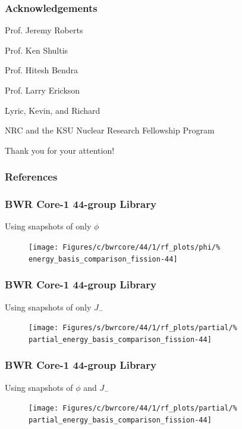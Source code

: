 \documentclass[fleqn]{beamer}
\begin{document}
  \begin{frame}
      \frametitle{Acknowledgements}
      \begin{block}{}
              Prof. Jeremy Roberts
              
              Prof. Ken Shultis
              
              Prof. Hitesh Bendra
              
              Prof. Larry Erickson
              
              Lyric, Kevin, and Richard
              
              NRC and the KSU Nuclear Research Fellowship Program
      \end{block}
      Thank you for your attention!
  \end{frame}

  
  \begin{frame}[t,allowframebreaks]\label{lastframe}
    \frametitle{References}
    
    {\scriptsize }
  \end{frame}
  
  \beginbackup
  
    \begin{frame}[noframenumbering]
    \frametitle{BWR Core-1 44-group Library}
    \centering
    Using snapshots of only $\phi$
    \begin{figure}
    \texttt{[image: Figures/c/bwrcore/44/1/rf\_plots/phi/\%
        energy\_basis\_comparison\_fission-44]}
    \end{figure}
  \end{frame}
  
  \begin{frame}[noframenumbering]
    \frametitle{BWR Core-1 44-group Library}
    \centering
    Using snapshots of only $J_-$
    \begin{figure}
    \texttt{[image: Figures/s/bwrcore/44/1/rf\_plots/partial/\%
        partial\_energy\_basis\_comparison\_fission-44]}
    \end{figure}
  \end{frame}
  
  \begin{frame}[noframenumbering]
    \frametitle{BWR Core-1 44-group Library}
    \centering
    Using snapshots of $\phi$ and $J_-$
    \begin{figure}
    \texttt{[image: Figures/c/bwrcore/44/1/rf\_plots/partial/\%
        partial\_energy\_basis\_comparison\_fission-44]}
    \end{figure}
  \end{frame}
  
\end{document}

